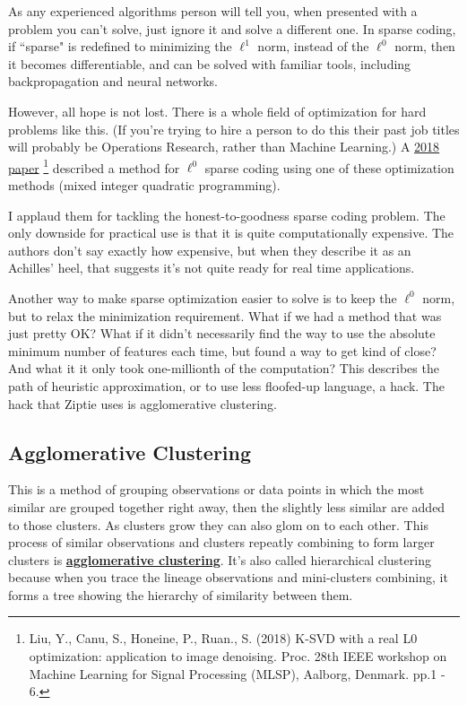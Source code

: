 As any experienced algorithms person will tell you, when presented
with a problem you can't solve, just ignore it and solve a different one.
In sparse coding, if ``sparse" is redefined to minimizing the $\ell^1$ norm,
instead of the $\ell^0$ norm, then it becomes differentiable, and can be
solved with familiar tools, including backpropagation and neural networks.

However, all hope is not lost. There is a whole field of optimization
for hard problems like this. (If you're trying to hire a person to do this
their past job titles will probably be Operations Research, rather than
Machine Learning.)
A \href{https://hal.science/hal-01965904/document}{2018 paper}
\footnote{Liu, Y., Canu, S., Honeine, P., Ruan., S. (2018)
K-SVD with a real L0 optimization: application
to image denoising.
Proc. 28th IEEE workshop on Machine Learning for Signal Processing (MLSP),
Aalborg, Denmark. pp.1 - 6.}
described a method for $\ell^0$ sparse coding using
one of these optimization methods (mixed integer quadratic programming).

I applaud them for tackling the honest-to-goodness sparse coding problem.
The only downside for practical use is that it is quite computationally
expensive. The authors don't say exactly how expensive, but when
they describe it as an Achilles' heel, that suggests it's not quite
ready for real time applications.

Another way to make sparse optimization easier to solve is to keep the
$\ell^0$ norm, but to relax the minimization requirement. What if we had
a method that was just pretty OK? What if it didn't necessarily
find the way to use the absolute minimum number of features each time,
but found a way to get kind of close? And what it it only took one-millionth
of the computation? This describes the path of heuristic approximation,
or to use less floofed-up language, a hack. The hack that Ziptie uses is
agglomerative clustering.

\subsection{Agglomerative Clustering}
\label{subsec:agglomeration}

This is a method of grouping observations or data points in which
the most similar are grouped together right away, then the slightly less
similar are added to those clusters. As clusters grow they can also glom on
to each other. This process of similar observations and clusters
repeatly combining to form larger clusters is
\textbf{\href{
https://en.wikipedia.org/w/index.php?title=Hierarchical_clustering&section=3
}{agglomerative clustering}}.
It's also called hierarchical clustering because when you trace the lineage
observations and mini-clusters combining, it forms a tree showing
the hierarchy of similarity between them. 

